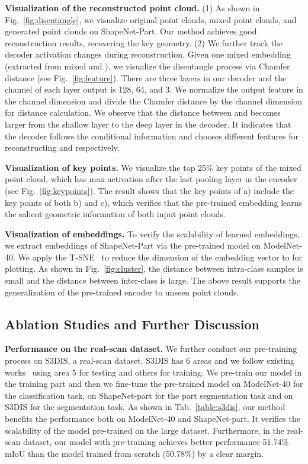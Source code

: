 \documentclass[journal]{IEEEtran}
\begin{document}
\textbf{Visualization of the reconstructed point cloud.} (1) As shown in Fig.~\ref{fig:disentangle}, we visualize original point clouds, mixed point clouds, and generated point clouds on ShapeNet-Part. 
Our method achieves good reconstruction results, recovering the key geometry. 
(2) We further track the decoder activation changes during reconstruction.  Given one mixed embedding (extracted from mixed  and ), we visualize the disentangle process via Chamfer distance (see Fig.~\ref{fig:feature}). 
There are three layers in our decoder and the channel of each layer output is 128, 64, and 3.  We normalize the output feature in the channel dimension and divide the Chamfer distance by the channel dimension for distance calculation. We observe that the distance between  and  becomes larger from the shallow layer to the deep layer in the decoder. It indicates that the decoder follows the conditional information and chooses different features for reconstructing  and  respectively.


\textbf{Visualization of key points.} We visualize the top 25\% key points of the mixed point cloud, which has max activation after the last pooling layer in the encoder (see Fig.~\ref{fig:keypoints}). The result shows that the key points of a) include the key points of both b) and c), which verifies that the pre-trained embedding learns the salient geometric information of both input point clouds. 


\textbf{Visualization of embeddings.} To verify the scalability of learned embeddings, we extract embeddings of ShapeNet-Part via the pre-trained model on ModelNet-40. We apply the T-SNE~\cite{van2008visualizing} to reduce the dimension of the embedding vector to  for plotting. As shown in Fig.~\ref{fig:cluster}, the distance between intra-class samples is small and the distance between inter-class is large. The above result supports the generalization of the pre-trained encoder to unseen point clouds. 

\subsection{Ablation Studies and Further Discussion}

\textbf{Performance on the real-scan dataset.}
We further conduct our pre-training process on S3DIS, a real-scan dataset. S3DIS has 6 areas and we follow existing works~\cite{zhao2021point} using area 5 for testing and others for training. We pre-train our model in the training part and then we fine-tune the pre-trained model on ModelNet-40 for the classification task, on ShapeNet-part for the part segmentation task and on S3DIS for the segmentation task. As shown in Tab.~\ref{table:s3dis}, our method benefits the performance both on ModelNet-40 and ShapeNet-part. It verifies the scalability of the model pre-trained on the large dataset. 
Furthermore, in the real-scan dataset, our model with pre-training achieves better performance 51.74\% mIoU than the model trained from scratch (50.78\%) by a clear margin.
\end{document}
